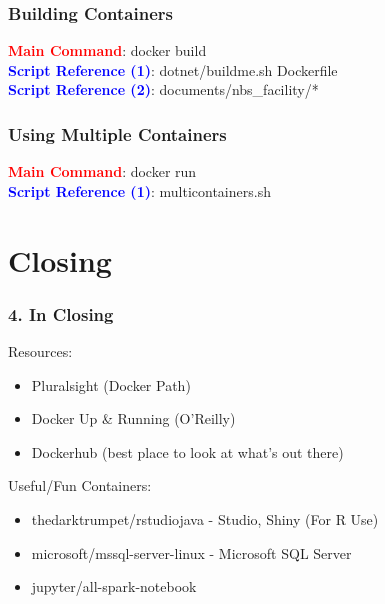 \documentclass{beamer}
\begin{document}
\begin{frame}
    \frametitle{Building Containers}
    \textcolor{red}{\textbf{Main Command}}: docker build \\
    \textcolor{blue}{\textbf{Script Reference (1)}}: dotnet/buildme.sh Dockerfile \\
    \textcolor{blue}{\textbf{Script Reference (2)}}: documents/nbs\_facility/*
\end{frame}

\begin{frame}
    \frametitle{Using Multiple Containers}
    \textcolor{red}{\textbf{Main Command}}: docker run \\
    \textcolor{blue}{\textbf{Script Reference (1)}}: multicontainers.sh
\end{frame}

\section{Closing}
\begin{frame}
    \frametitle{4. In Closing}
    Resources:
    \begin{itemize}
        \item Pluralsight (Docker Path)
        \item Docker Up \& Running (O'Reilly)
        \item Dockerhub (best place to look at what's out there)
    \end{itemize}
    Useful/Fun Containers:
    \begin{itemize}
        \item thedarktrumpet/rstudiojava - Studio, Shiny (For R Use)
        \item microsoft/mssql-server-linux - Microsoft SQL Server
        \item jupyter/all-spark-notebook
    \end{itemize}
\end{frame}
\end{document}
